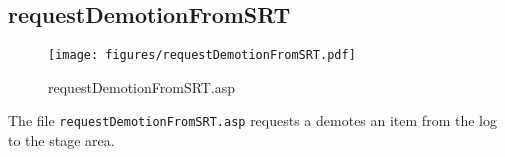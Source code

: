 \subsection{requestDemotionFromSRT}
\begin{figure}[htb]
    \begin{center}
        \texttt{[image: figures/requestDemotionFromSRT.pdf]}
    \end{center}
    \caption{requestDemotionFromSRT.asp}
    \label{fig:requestDemotionFromSRT}
\end{figure}

The file \verb|requestDemotionFromSRT.asp| requests a demotes an item from the
log to the stage area.

